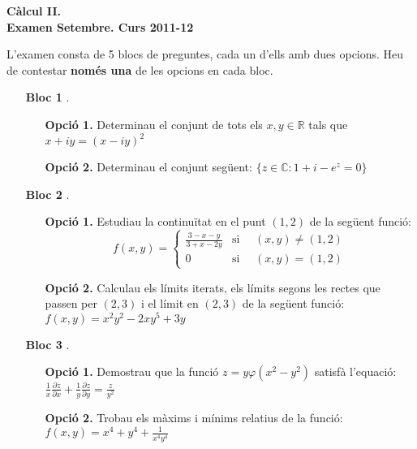 \documentclass[12pt]{report}
\newcommand\R{\mathbb{R}}
\newcommand\C{\mathbb{C}}
\begin{document}
\begin{center}
\textbf{\Large Càlcul II.\\ Examen Setembre. Curs 2011-12}
\end{center}

\vskip 0.3cm
\noindent
L'examen consta de 5 blocs de preguntes, cada un d'ells amb dues opcions. Heu de contestar \textbf{només una} de les opcions
en cada bloc.

\vskip 0.5cm
\begin{enumerate}
\item[\textbf{Bloc 1}]. 

\begin{enumerate}
\item[
\textbf{Opció 1.}] Determinau el conjunt de tots els $x, y \in \R$ tals que $x+iy=(x-iy)^2$
\item[
\textbf{Opció 2.}] Determinau el conjunt següent: $\{ z \in \C : 1+i-e^{z}=0 \}$
\end{enumerate}

\vskip 0.3cm

\item[\textbf{Bloc 2}]. 

\begin{enumerate}
\item[
\textbf{Opció 1.}]  Estudiau la continuïtat en el punt $(1, 2)$ de la següent funció:
\[
f(x, y)=\begin{cases} \frac{3-x-y}{3+x-2y}  & \text{si } \quad (x, y) \neq (1, 2) \\ 0 & \text{si } \quad (x, y)=(1, 2) \end{cases}
\]
\item[
\textbf{Opció 2.}] Calculau els límits iterats, els límits segons les rectes que passen per $(2, 3)$ i el límit en $(2, 3)$
de la següent funció:
$
f(x, y)=x^2y^2-2xy^5+3y
$
\end{enumerate}

\vskip 0.3cm

\item[\textbf{Bloc 3}].

\begin{enumerate}
\item[
\textbf{Opció 1.}]  Demostrau que la funció $z=y \varphi(x^2-y^2)$ satisfà l'equació:
$
\displaystyle
\frac{1}{x} \frac{\partial z}{\partial x} + \frac{1}{y} \frac{\partial z}{\partial y}=\frac{z}{y^2}
$
\item[
\textbf{Opció 2.}]  Trobau els màxims i mínims relatius de la funció:
$
\displaystyle
f(x, y)=x^4+y^4+\frac{1}{x^4y^4}
$
\end{enumerate}


\end{enumerate}
\end{document}
